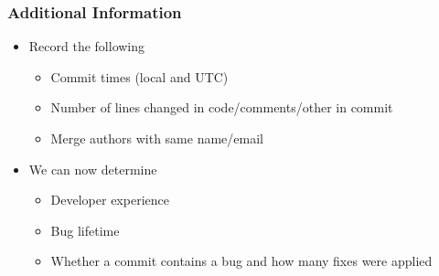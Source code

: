 \documentclass[aspectratio=43]{beamer}
\begin{document}
\begin{frame}
  \frametitle{Additional Information}

  \begin{itemize}

    \item Record the following

    \begin{itemize}
      \item Commit times (local and UTC)

      \item Number of lines changed in code/comments/other in commit

      \item Merge authors with same name/email
    \end{itemize}

    \item We can now determine    
  
      \begin{itemize}
        \item Developer experience

        \item Bug lifetime

        \item Whether a commit contains a bug and how many fixes were applied
      \end{itemize}
  \end{itemize}
\end{frame}
\end{document}

